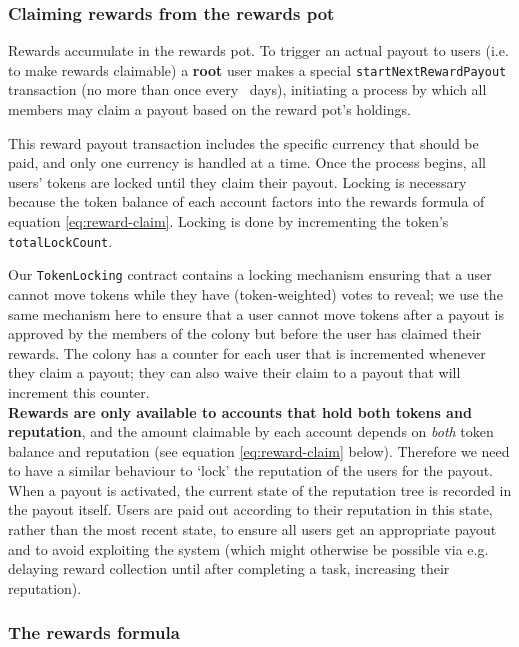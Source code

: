 \subsubsection{Claiming rewards from the rewards pot}\label{sec:claimrewards}

Rewards accumulate in the rewards pot. To trigger an actual payout to users (i.e. to make rewards claimable) a \textbf{root} user makes a special \texttt{startNextRewardPayout} transaction (no more than once every \rewardclaimduration\ days), initiating a process by which all members may claim a payout based on the reward pot's holdings.

This reward payout transaction includes the specific currency that should be paid, and only one currency is handled at a time. Once the process begins, all users' tokens are locked until they claim their payout. Locking is necessary because the token balance of each account factors into the rewards formula of equation \eqref{eq:reward-claim}. Locking is done by incrementing the token's \texttt{totalLockCount}.

Our \texttt{TokenLocking} contract contains a locking mechanism ensuring that a user cannot move tokens while they have (token-weighted) votes to reveal; we use the same mechanism here to ensure that a user cannot move tokens after a payout is approved by the members of the colony but before the user has claimed their rewards. The colony has a counter for each user that is incremented whenever they claim a payout; they can also waive their claim to a payout that will increment this counter. \\

\textbf{Rewards are only available to accounts that hold both tokens and reputation}, and the amount claimable by each account depends on \emph{both} token balance and reputation (see equation \eqref{eq:reward-claim} below). Therefore we need to have a similar behaviour to `lock' the reputation of the users for the payout. When a payout is activated, the current state of the reputation tree is recorded in the payout itself. Users are paid out according to their reputation in this state, rather than the most recent state, to ensure all users get an appropriate payout and to avoid exploiting the system (which might otherwise be possible via e.g. delaying reward collection until after completing a task, increasing their reputation).

\subsubsection{The rewards formula}

